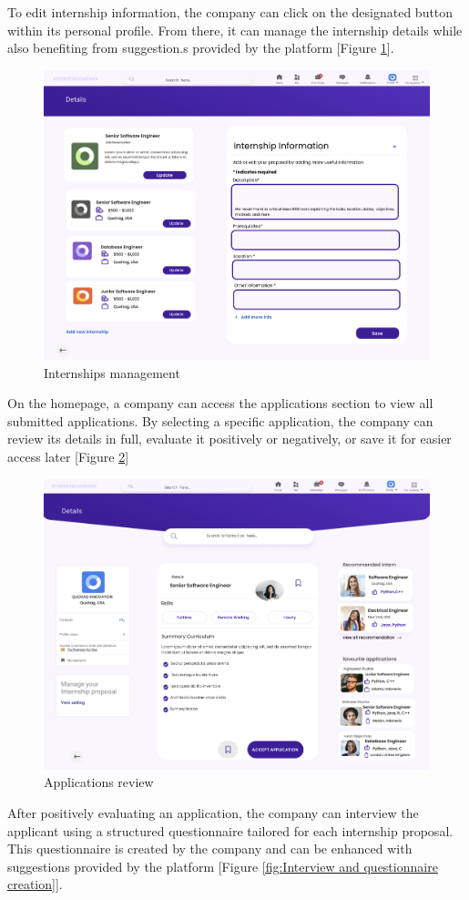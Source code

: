 To edit internship information, the company can click on the designated button within its personal profile. From there, it can manage the internship details while also benefiting from suggestion.s provided by the platform [Figure \ref{fig:Internships management}]. 

\begin{figure} [H]
    \centering
    \includegraphics[width=0.5\linewidth]{Interface Images/company interface/Screenshot 2024-12-12 050044.png}
    \caption{Internships management}
    \label{fig:Internships management}
\end{figure}

On the homepage, a company can access the applications section to view all submitted applications. By selecting a specific application, the company can review its details in full, evaluate it positively or negatively, or save it for easier access later [Figure \ref{fig:Application review}] 

\begin{figure} [H]
    \centering
    \includegraphics[width=0.5\linewidth]{Interface Images/company interface/Screenshot 2024-12-12 045731.png}
    \caption{Applications review}
    \label{fig:Application review}
\end{figure}


After positively evaluating an application, the company can interview the applicant using a structured questionnaire tailored for each internship proposal. This questionnaire is created by the company and can be enhanced with suggestions provided by the platform [Figure \ref{fig:Interview and questionnaire creation}].

